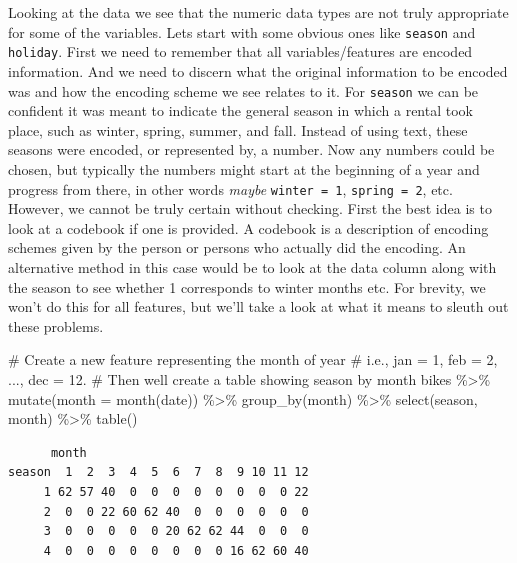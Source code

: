 \documentclass[
  letterpaper,
  DIV=11,
  numbers=noendperiod]{scrartcl}
\newenvironment{Shaded}{\begin{snugshade}}{\end{snugshade}}
\newcommand{\AttributeTok}[1]{\textcolor[rgb]{0.40,0.45,0.13}{#1}}
\newcommand{\CommentTok}[1]{\textcolor[rgb]{0.37,0.37,0.37}{#1}}
\newcommand{\FunctionTok}[1]{\textcolor[rgb]{0.28,0.35,0.67}{#1}}
\newcommand{\NormalTok}[1]{\textcolor[rgb]{0.00,0.23,0.31}{#1}}
\newcommand{\SpecialCharTok}[1]{\textcolor[rgb]{0.37,0.37,0.37}{#1}}
\begin{document}
Looking at the data we see that the numeric data types are not truly
appropriate for some of the variables. Lets start with some obvious ones
like \texttt{season} and \texttt{holiday}. First we need to remember
that all variables/features are encoded information. And we need to
discern what the original information to be encoded was and how the
encoding scheme we see relates to it. For \texttt{season} we can be
confident it was meant to indicate the general season in which a rental
took place, such as winter, spring, summer, and fall. Instead of using
text, these seasons were encoded, or represented by, a number. Now any
numbers could be chosen, but typically the numbers might start at the
beginning of a year and progress from there, in other words \emph{maybe}
\texttt{winter\ =\ 1}, \texttt{spring\ =\ 2}, etc. However, we cannot be
truly certain without checking. First the best idea is to look at a
codebook if one is provided. A codebook is a description of encoding
schemes given by the person or persons who actually did the encoding. An
alternative method in this case would be to look at the data column
along with the season to see whether 1 corresponds to winter months etc.
For brevity, we won't do this for all features, but we'll take a look at
what it means to sleuth out these problems.

\begin{Shaded}
\begin{Highlighting}[]
\CommentTok{\# Create a new feature representing the month of year}
\CommentTok{\# i.e., jan = 1, feb = 2, ..., dec = 12.}
\CommentTok{\# Then we\textquotesingle{}ll create a table showing season by month}
\NormalTok{bikes }\SpecialCharTok{\%\textgreater{}\%}
  \FunctionTok{mutate}\NormalTok{(}\AttributeTok{month =} \FunctionTok{month}\NormalTok{(date)) }\SpecialCharTok{\%\textgreater{}\%}
  \FunctionTok{group\_by}\NormalTok{(month) }\SpecialCharTok{\%\textgreater{}\%}
  \FunctionTok{select}\NormalTok{(season, month) }\SpecialCharTok{\%\textgreater{}\%}
  \FunctionTok{table}\NormalTok{()}
\end{Highlighting}
\end{Shaded}

\begin{verbatim}
      month
season  1  2  3  4  5  6  7  8  9 10 11 12
     1 62 57 40  0  0  0  0  0  0  0  0 22
     2  0  0 22 60 62 40  0  0  0  0  0  0
     3  0  0  0  0  0 20 62 62 44  0  0  0
     4  0  0  0  0  0  0  0  0 16 62 60 40
\end{verbatim}
\end{document}
